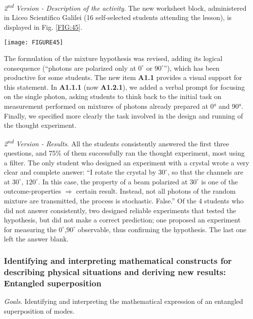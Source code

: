 \documentclass[twocolumn,secnumarabic,amssymb, nobibnotes, aps, prd, nofootinbib]{revtex4-2}
\begin{document}
\emph{2\textsuperscript{nd} Version - Description of the activity}. The new worksheet block, administered in Liceo Scientifico Galilei (16 self-selected students attending the lesson), is displayed in Fig. \ref{FIG:45}.
\begin{figure*}[!htpb]
       \texttt{[image: FIGURE45]}
    \caption{Worksheet block on the interpretation of quantum superposition: Liceo Galilei, Trieste, 2019}
    \label{FIG:45}
\end{figure*}
The formulation of the mixture hypothesis was revised, adding its logical consequence (``photons are polarized only at $0^{\circ}$ or $90^{\circ}$''), which has been productive for some students. The new item \textbf{A1.1} provides a visual support for this statement. In \textbf{A1.1.1} (now \textbf{A1.2.1}), we added a verbal prompt for focusing on the single photon, asking students to think back to the initial task on measurement performed on mixtures of photons already prepared at 0° and 90°. Finally, we specified more clearly the task involved in the design and running of the thought experiment.

\emph{2\textsuperscript{nd} Version - Results}. All the students consistently answered the first three questions, and 75\% of them successfully ran the thought experiment, most using a filter. The only student who designed an experiment with a crystal wrote a very clear and complete answer: ``I rotate the crystal by $30^{\circ}$, so that the channels are at $30^{\circ}$, $120^{\circ}$. In this case, the property of a beam polarized at $30^{\circ}$ is one of the outcome-properties $\Rightarrow$ certain result. Instead, not all photons of the random mixture are transmitted, the process is stochastic. False.'' Of the 4 students who did not answer consistently, two designed reliable experiments that tested the hypothesis, but did not make a correct prediction; one proposed an experiment for measuring the $0^{\circ}$,$90^{\circ}$ observable, thus confirming the hypothesis. The last one left the answer blank.

\subsubsection{Identifying and interpreting mathematical constructs for describing physical situations and deriving new results: Entangled superposition} \label{Sec:5.4.4}

\emph{Goals}. Identifying and interpreting the mathematical expression of an entangled superposition of modes.
\end{document}
